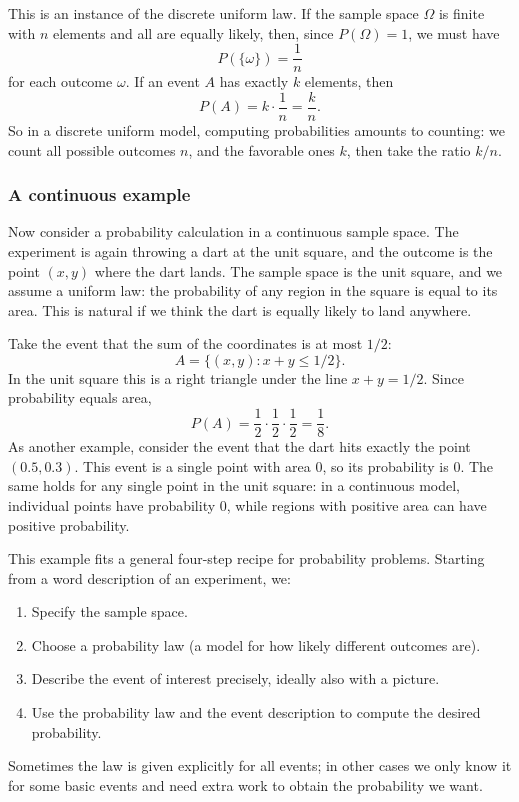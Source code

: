 This is an instance of the discrete uniform law. If the sample space \(\Omega\) is finite with \(n\) elements and all are equally likely, then, since \(P(\Omega) = 1\), we must have
\[
P(\{\omega\}) = \frac{1}{n}
\]
for each outcome \(\omega\). If an event \(A\) has exactly \(k\) elements, then
\[
P(A) = k \cdot \frac{1}{n} = \frac{k}{n}.
\]
So in a discrete uniform model, computing probabilities amounts to counting: we count all possible outcomes \(n\), and the favorable ones \(k\), then take the ratio \(k/n\).

\subsubsection{A continuous example}

Now consider a probability calculation in a continuous sample space. The experiment is again throwing a dart at the unit square, and the outcome is the point \((x,y)\) where the dart lands. The sample space is the unit square, and we assume a uniform law: the probability of any region in the square is equal to its area. This is natural if we think the dart is equally likely to land anywhere.

Take the event that the sum of the coordinates is at most \(1/2\):
\[
A = \{(x,y) : x + y \le 1/2\}.
\]
In the unit square this is a right triangle under the line \(x + y = 1/2\). Since probability equals area,
\[
P(A) = \frac{1}{2} \cdot \frac{1}{2} \cdot \frac{1}{2} = \frac{1}{8}.
\]
As another example, consider the event that the dart hits exactly the point \((0.5, 0.3)\). This event is a single point with area 0, so its probability is 0. The same holds for any single point in the unit square: in a continuous model, individual points have probability 0, while regions with positive area can have positive probability.

This example fits a general four-step recipe for probability problems. Starting from a word description of an experiment, we:
\begin{enumerate}
    \item Specify the sample space.
    \item Choose a probability law (a model for how likely different outcomes are).
    \item Describe the event of interest precisely, ideally also with a picture.
    \item Use the probability law and the event description to compute the desired probability.
\end{enumerate}
Sometimes the law is given explicitly for all events; in other cases we only know it for some basic events and need extra work to obtain the probability we want.


